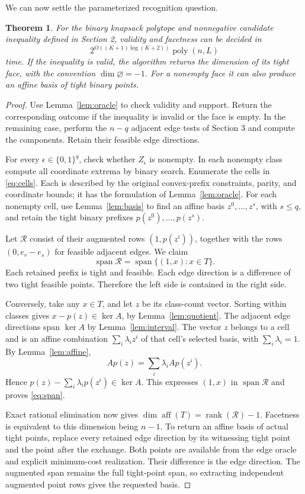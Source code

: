 \documentclass[11pt]{article}
\newtheorem{theorem}{Theorem}
\newcommand{\aff}{\operatorname{aff}}\newcommand{\spn}{\operatorname{span}}
\begin{document}
We can now settle the parameterized recognition question.
\begin{theorem}\label{thm:main}
For the binary knapsack polytope and nonnegative candidate inequality defined in Section 2, validity and facetness can be decided in
\[
 2^{O((K+1)\log(K+2))}\operatorname{poly}(n,L)
\]
time. If the inequality is valid, the algorithm returns the dimension of its tight face, with the convention $\dim\varnothing=-1$. For a nonempty face it can also produce an affine basis of tight binary points.
\end{theorem}
\begin{proof}
Use Lemma~\ref{lem:oracle} to check validity and support. Return the corresponding outcome if the inequality is invalid or the face is empty. In the remaining case, perform the $n-q$ adjacent edge tests of Section 3 and compute the components. Retain their feasible edge directions.

For every $\epsilon\in\{0,1\}^q$, check whether $Z_\epsilon$ is nonempty. In each nonempty class compute all coordinate extrema by binary search. Enumerate the cells in \eqref{eq:cells}. Each is described by the original convex-prefix constraints, parity, and coordinate bounds; it has the formulation of Lemma~\ref{lem:oracle}. For each nonempty cell, use Lemma~\ref{lem:basis} to find an affine basis $z^0,\ldots,z^s$, with $s\le q$, and retain the tight binary prefixes $p(z^0),\ldots,p(z^s)$.

Let $\mathcal R$ consist of their augmented rows $(1,p(z^i))$, together with the rows $(0,e_r-e_s)$ for feasible adjacent edges. We claim
\begin{equation}\label{eq:span}
 \spn\mathcal R=\spn\{(1,x):x\in T\}.
\end{equation}
Each retained prefix is tight and feasible. Each edge direction is a difference of two tight feasible points. Therefore the left side is contained in the right side.

Conversely, take any $x\in T$, and let $z$ be its class-count vector. Sorting within classes gives $x-p(z)\in\ker A$, by Lemma~\ref{lem:quotient}. The adjacent edge directions span $\ker A$ by Lemma~\ref{lem:interval}. The vector $z$ belongs to a cell and is an affine combination $\sum_i\lambda_i z^i$ of that cell's selected basis, with $\sum_i\lambda_i=1$. By Lemma~\ref{lem:affine},
\[
 A p(z)=\sum_i\lambda_i A p(z^i).
\]
Hence $p(z)-\sum_i\lambda_i p(z^i)\in\ker A$. This expresses $(1,x)$ in $\spn\mathcal R$ and proves \eqref{eq:span}.

Exact rational elimination now gives $\dim\aff(T)=\operatorname{rank}(\mathcal R)-1$. Facetness is equivalent to this dimension being $n-1$. To return an affine basis of actual tight points, replace every retained edge direction by its witnessing tight point and the point after the exchange. Both points are available from the edge oracle and explicit minimum-cost realization. Their difference is the edge direction. The augmented span remains the full tight-point span, so extracting independent augmented point rows gives the requested basis.


\end{proof}
\end{document}
